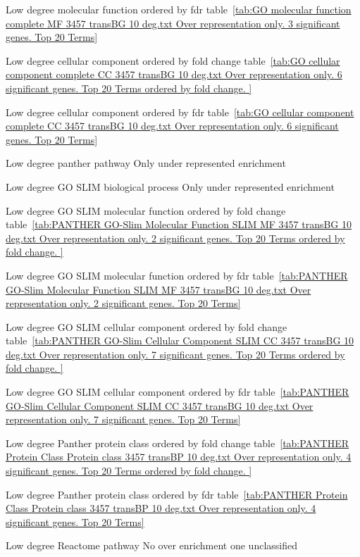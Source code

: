 Low degree molecular function ordered by fdr table~\ref{tab:GO molecular function complete MF 3457 transBG 10 deg.txt Over representation only. 3 significant genes. Top 20 Terms}

Low degree cellular component ordered by fold change table~\ref{tab:GO cellular component complete CC 3457 transBG 10 deg.txt Over representation only. 6 significant genes. Top 20 Terms ordered by fold change. }


Low degree cellular component ordered by fdr table~\ref{tab:GO cellular component complete CC 3457 transBG 10 deg.txt Over representation only. 6 significant genes. Top 20 Terms}

Low degree panther pathway Only under represented enrichment 

Low degree GO SLIM biological process Only under represented enrichment

Low degree GO SLIM molecular function ordered by fold change table~\ref{tab:PANTHER GO-Slim Molecular Function SLIM MF 3457 transBG 10 deg.txt Over representation only. 2 significant genes. Top 20 Terms ordered by fold change. }

Low degree GO SLIM molecular function ordered by fdr table~\ref{tab:PANTHER GO-Slim Molecular Function SLIM MF 3457 transBG 10 deg.txt Over representation only. 2 significant genes. Top 20 Terms}

Low degree GO SLIM cellular component ordered by fold change table~\ref{tab:PANTHER GO-Slim Cellular Component SLIM CC 3457 transBG 10 deg.txt Over representation only. 7 significant genes. Top 20 Terms ordered by fold change. }

Low degree GO SLIM cellular component ordered by fdr table~\ref{tab:PANTHER GO-Slim Cellular Component SLIM CC 3457 transBG 10 deg.txt Over representation only. 7 significant genes. Top 20 Terms}

Low degree Panther protein class ordered by fold change table~\ref{tab:PANTHER Protein Class Protein class 3457 transBP 10 deg.txt Over representation only. 4 significant genes. Top 20 Terms ordered by fold change. }

Low degree Panther protein class ordered by fdr table~\ref{tab:PANTHER Protein Class Protein class 3457 transBP 10 deg.txt Over representation only. 4 significant genes. Top 20 Terms}

Low degree Reactome pathway No over enrichment one unclassified






